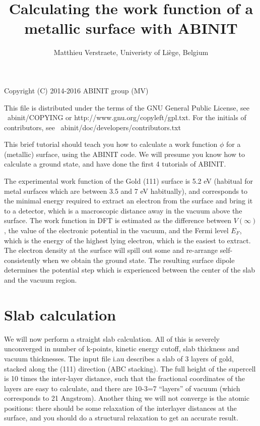 \documentclass{report}
\begin{document}
\title{Calculating the work function of a metallic surface with ABINIT}

\author{Matthieu Verstraete, Univeristy of Li\`ege, Belgium}

\maketitle
Copyright (C) 2014-2016 ABINIT group (MV)

This file is distributed under the terms of the
GNU General Public License, see ~abinit/COPYING
or http://www.gnu.org/copyleft/gpl.txt.
For the initials of contributors, see ~abinit/doc/developers/contributors.txt

This brief tutorial should teach you how to calculate a work function $\phi$ for a (metallic) surface, using the ABINIT code. We will presume you know how to calculate a ground state, and have done the first 4 tutorials of ABINIT.

The experimental work function of the Gold (111) surface is 5.2 eV (habitual for metal surfaces which are between 3.5 and 7 eV habitually), and corresponds to the minimal energy required to extract an electron from the surface and bring it to a detector, which is a macroscopic distance away in the vacuum above the surface. The work function in DFT is estimated as the difference between $V(\infty)$, the value of the electronic potential in the vacuum, and the Fermi level $E_F$, which is the energy of the highest lying electron, which is the easiest to extract. The electron density at the surface will spill out some and re-arrange self-consistently when we obtain the ground state. The resulting surface dipole determines the potential step which is experienced between the center of the slab and the vacuum region.

\section{Slab calculation}
We will now perform a straight slab calculation. All of this is severely unconverged in number of k-points, kinetic energy cutoff,  slab thickness and vacuum thicknesses. The input file i.au describes a slab of 3 layers of gold, stacked along the (111) direction (ABC stacking). The full height of the supercell is 10 times the inter-layer distance, such that the fractional coordinates of the layers are easy to calculate, and there are 10-3=7 ``layers'' of vacuum (which corresponds to 21 Angstrom). Another thing we will not converge is the atomic positions: there should be some relaxation of the interlayer distances at the surface, and you should do a structural relaxation to get an accurate result.
\end{document}
